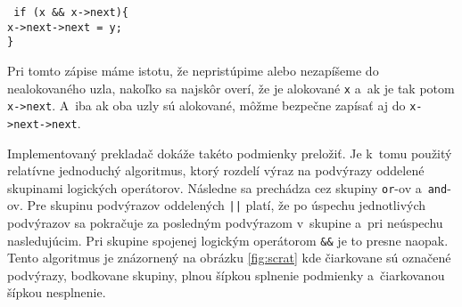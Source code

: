 \noindent
\texttt{
if (x \&\& x->next)\{\\
\tab x->next->next = y;\\
\}\\
}

Pri tomto zápise máme istotu, že nepristúpime alebo nezapíšeme do nealokovaného uzla, nakoľko sa najskôr overí, že je  alokované \texttt{x} a~ak je tak potom \texttt{x->next}. A~iba ak oba uzly sú alokované, môžme bezpečne zapísať aj do \texttt{x->next->next}.

Implementovaný prekladač dokáže takéto podmienky preložiť. Je k~tomu použitý relatívne jednoduchý algoritmus, ktorý rozdelí výraz na podvýrazy oddelené skupinami logických operátorov. Následne sa prechádza cez skupiny \texttt{or}-ov a~\texttt{and}-ov. Pre skupinu podvýrazov oddelených \texttt{||} platí, že po úspechu jednotlivých podvýrazov sa pokračuje za posledným podvýrazom v~skupine a~pri neúspechu nasledujúcim. Pri skupine spojenej logickým operátorom \texttt{\&\&} je to presne naopak. Tento algoritmus je znázornený na obrázku \ref{fig:scrat} kde čiarkovane sú označené podvýrazy, bodkovane skupiny, plnou šípkou splnenie podmienky a~čiarkovanou šípkou nesplnenie.

